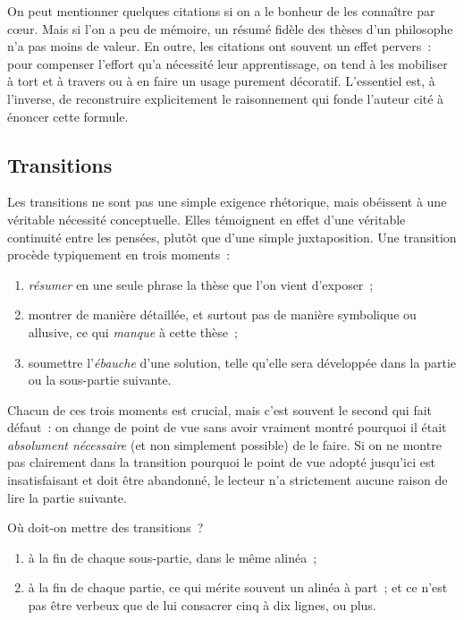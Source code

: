 \documentclass[a4paper,12pt]{article}
\begin{document}
On peut mentionner quelques citations si on a le bonheur de les
connaître par cœur. Mais si l'on a peu de mémoire, un résumé fidèle des
thèses d'un philosophe n'a pas moins de valeur. En outre, les citations
ont souvent un effet pervers : pour compenser l'effort qu'a nécessité
leur apprentissage, on tend à les mobiliser à tort et à travers ou à en
faire un usage purement décoratif. L'essentiel est, à l'inverse, de
reconstruire explicitement le raisonnement qui fonde l'auteur cité à
énoncer cette formule.

\subsection{Transitions}
\label{sec-3-6}

Les transitions ne sont pas une simple exigence rhétorique, mais
obéissent à une véritable nécessité conceptuelle. Elles témoignent en
effet d'une véritable continuité entre les pensées, plutôt que d'une
simple juxtaposition. Une transition procède typiquement en trois
moments :

\begin{enumerate}
\item \emph{résumer} en une seule phrase la thèse que l'on vient d'exposer ;

\item montrer de manière détaillée, et surtout pas de manière symbolique ou
allusive, ce qui \emph{manque} à cette thèse ;

\item soumettre l'\emph{ébauche} d'une solution, telle qu'elle sera développée
dans la partie ou la sous-partie suivante.
\end{enumerate}

Chacun de ces trois moments est crucial, mais c'est souvent le second
qui fait défaut : on change de point de vue sans avoir vraiment montré
pourquoi il était \emph{absolument nécessaire} (et non simplement possible)
de le faire. Si on ne montre pas clairement dans la transition pourquoi
le point de vue adopté jusqu'ici est insatisfaisant et doit être
abandonné, le lecteur n'a strictement aucune raison de lire la partie
suivante.

Où doit-on mettre des transitions ?

\begin{enumerate}
\item à la fin de chaque sous-partie, dans le même alinéa ;

\item à la fin de chaque partie, ce qui mérite souvent un alinéa à part ;
et ce n'est pas être verbeux que de lui consacrer cinq à dix lignes,
ou plus.
\end{enumerate}
\end{document}
